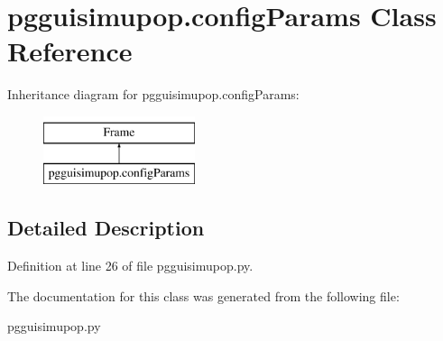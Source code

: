 \hypertarget{classpgguisimupop_1_1configParams}{}\section{pgguisimupop.\+config\+Params Class Reference}
\label{classpgguisimupop_1_1configParams}
Inheritance diagram for pgguisimupop.\+config\+Params\+:\begin{figure}[H]
\begin{center}
\leavevmode
\includegraphics[height=2.000000cm]{classpgguisimupop_1_1configParams}
\end{center}
\end{figure}


\subsection{Detailed Description}


Definition at line 26 of file pgguisimupop.\+py.



The documentation for this class was generated from the following file\+:\begin{DoxyCompactItemize}
\item 
pgguisimupop.\+py\end{DoxyCompactItemize}
